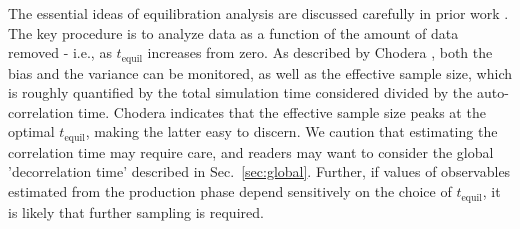 The essential ideas of equilibration analysis are discussed carefully in prior work \cite{Yang2004,Chodera-2016}.
The key procedure is to analyze data as a function of the amount of data removed - i.e., as $t_{\mathrm{equil}}$ increases from zero.
As described by Chodera \cite{Chodera-2016}, both the bias and the variance can be monitored, as well as the effective sample size, which is roughly quantified by the total simulation time considered divided by the auto-correlation time.
Chodera indicates that the effective sample size peaks at the optimal $t_{\mathrm{equil}}$, making the latter easy to discern.
We caution that estimating the correlation time may require care, and readers may want to consider the global 'decorrelation time' \cite{Lyman2007a} described in Sec.\ \ref{sec:global}.
Further, if values of observables estimated from the production phase depend sensitively on the choice of $t_{\mathrm{equil}}$, it is likely that further sampling is required.
